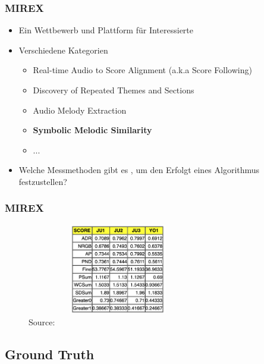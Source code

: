 \documentclass{beamer}
\begin{document}
	\begin{frame}
		\frametitle{MIREX}
		\begin{itemize}
			\item Ein Wettbewerb und Plattform für Interessierte
			\item Verschiedene Kategorien
				\begin{itemize}
					\item Real-time Audio to Score Alignment (a.k.a Score Following)
					\item Discovery of Repeated Themes and Sections
					\item Audio Melody Extraction
					\item \textbf{Symbolic Melodic Similarity}
					\item ...
				\end{itemize}
			\item Welche Messmethoden gibt es , um den Erfolgt eines Algorithmus festzustellen?
		\end{itemize}
	\end{frame}

	\begin{frame}
		\frametitle{MIREX}
		\begin{figure}[h!]
			\includegraphics[width=300px,height=150px,keepaspectratio]{MIREX_2014_results}
			\caption{Source: \cite{mirex_website_2014_results}}
		\end{figure}
	\end{frame}


	\subsection{Ground Truth}
		
\end{document}
